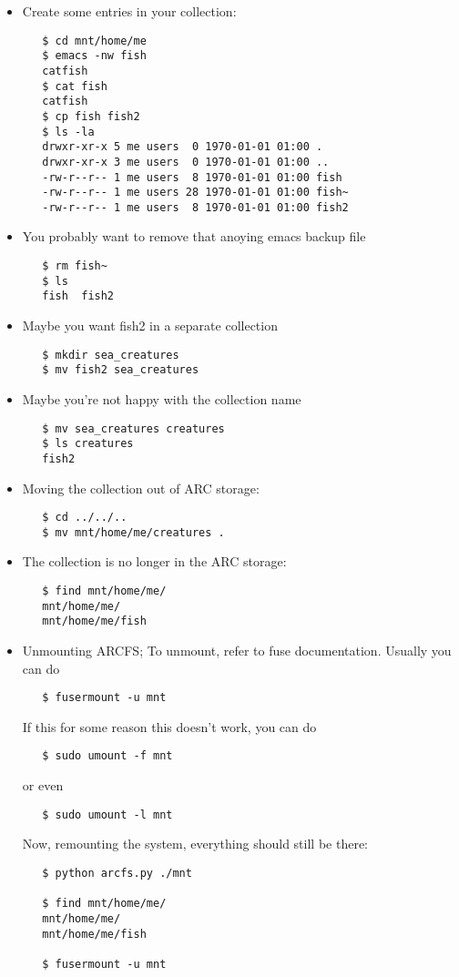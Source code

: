 \documentclass{article}
\begin{document}
\begin{itemize}
\item Create some entries in your collection:
\begin{verbatim}
   $ cd mnt/home/me
   $ emacs -nw fish
   catfish
   $ cat fish
   catfish
   $ cp fish fish2
   $ ls -la
   drwxr-xr-x 5 me users  0 1970-01-01 01:00 .
   drwxr-xr-x 3 me users  0 1970-01-01 01:00 ..
   -rw-r--r-- 1 me users  8 1970-01-01 01:00 fish
   -rw-r--r-- 1 me users 28 1970-01-01 01:00 fish~
   -rw-r--r-- 1 me users  8 1970-01-01 01:00 fish2
\end{verbatim}

\item You probably want to remove that anoying emacs backup file
\begin{verbatim}   
   $ rm fish~
   $ ls 
   fish  fish2
\end{verbatim}

\item Maybe you want fish2 in a separate collection
\begin{verbatim}   
   $ mkdir sea_creatures
   $ mv fish2 sea_creatures
\end{verbatim}

\item Maybe you're not happy with the collection name
\begin{verbatim}
   $ mv sea_creatures creatures
   $ ls creatures
   fish2
\end{verbatim}

\item Moving the collection out of ARC storage:
\begin{verbatim}
   $ cd ../../..
   $ mv mnt/home/me/creatures .
\end{verbatim}

\item The collection is no longer in the ARC storage:
\begin{verbatim}
   $ find mnt/home/me/
   mnt/home/me/
   mnt/home/me/fish
\end{verbatim}

\item Unmounting ARCFS; To unmount, refer to fuse documentation. Usually you can do
\begin{verbatim}   
   $ fusermount -u mnt
\end{verbatim}

If this for some reason this doesn't work, you can do
\begin{verbatim}   
   $ sudo umount -f mnt
\end{verbatim}   

or even
\begin{verbatim}   
   $ sudo umount -l mnt
\end{verbatim}   

Now, remounting the system, everything should still be there:
\begin{verbatim}
   $ python arcfs.py ./mnt

   $ find mnt/home/me/
   mnt/home/me/
   mnt/home/me/fish

   $ fusermount -u mnt
\end{verbatim}
\end{itemize}
\end{document}
